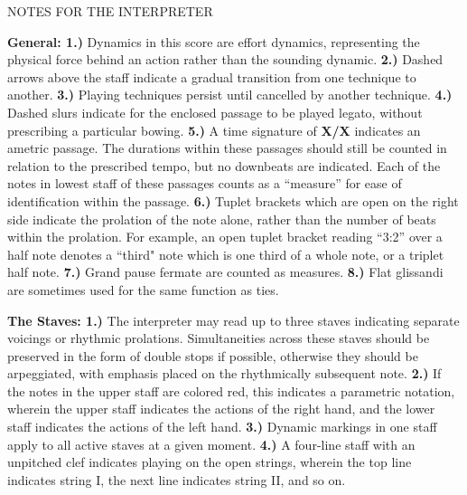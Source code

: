 \documentclass[10pt]{article}
\begin{document}
\begingroup
\begin{center}
\huge NOTES FOR THE INTERPRETER
\end{center}
\endgroup

\begingroup
\begin{center}
\huge 
\end{center}
\endgroup


\begingroup
\textbf{General: 1.)} Dynamics in this score are effort dynamics, representing the physical force behind an action rather than the sounding dynamic. \textbf{2.)} Dashed arrows above the staff indicate a gradual transition from one technique to another. \textbf{3.)} Playing techniques persist until cancelled by another technique. \textbf{4.)} Dashed slurs indicate for the enclosed passage to be played legato, without prescribing a particular bowing. \textbf{5.)} A time signature of \textbf{X/X} indicates an ametric passage. The durations within these passages should still be counted in relation to the prescribed tempo, but no downbeats are indicated. Each of the notes in lowest staff of these passages counts as a ``measure'' for ease of identification within the passage. \textbf{6.)} Tuplet brackets which are open on the right side indicate the prolation of the note alone, rather than the number of beats within the prolation. For example, an open tuplet bracket reading ``3:2'' over a half note denotes a ``third" note which is one third of a whole note, or a triplet half note. \textbf{7.)} Grand pause fermate are counted as measures. \textbf{8.)} Flat glissandi are sometimes used for the same function as ties. \\
\endgroup 

\begingroup
\textbf{The Staves: 1.)} The interpreter may read up to three staves indicating separate voicings or rhythmic prolations. Simultaneities across these staves should be preserved in the form of double stops if possible, otherwise they should be arpeggiated, with emphasis placed on the rhythmically subsequent note. \textbf{2.)} If the notes in the upper staff are colored red, this indicates a parametric notation, wherein the upper staff indicates the actions of the right hand, and the lower staff indicates the actions of the left hand. \textbf{3.)} Dynamic markings in one staff apply to all active staves at a given moment.  \textbf{4.)} A four-line staff with an unpitched clef indicates playing on the open strings, wherein the top line indicates string I, the next line indicates string II, and so on. \\
\endgroup
\end{document}
